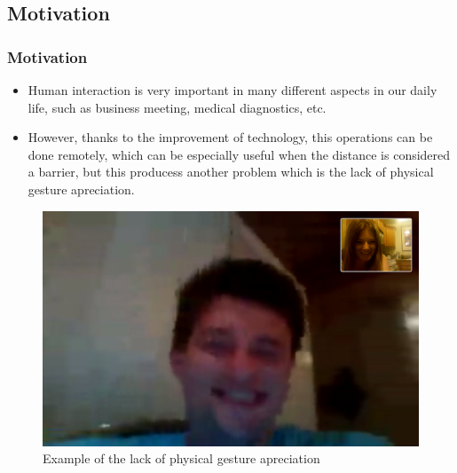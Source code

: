 \documentclass[compress]{beamer}
\begin{document}
\subsection{Motivation}
\begin{frame}
	\frametitle{Motivation}
	\begin{itemize}
	\item Human interaction is very important in many different aspects in our daily life, such as business meeting, medical diagnostics, etc.
	\item However, thanks to the improvement of technology, this operations can be done remotely, which can be especially useful when the distance is considered a barrier, but this producess another problem which is the lack of physical gesture apreciation.
	\end{itemize}
\end{frame}

\begin{frame}
	\begin{figure}
		\centering
		\includegraphics[scale=0.2]{img/pixelated.png}
		\caption{Example of the lack of physical gesture apreciation}
	\end{figure}
\end{frame}
\end{document}
